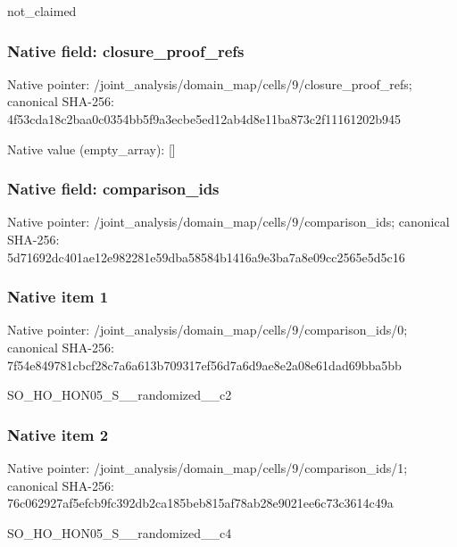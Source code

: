 \documentclass[10pt,a4paper]{article}
\begin{document}
\begingroup\raggedright\sloppy not\_\allowbreak{}claimed\par\endgroup

\subsubsection{Native field: closure\_\allowbreak{}proof\_\allowbreak{}refs}
Native pointer: /joint\_\allowbreak{}analysis/domain\_\allowbreak{}map/cells/9/closure\_\allowbreak{}proof\_\allowbreak{}refs; canonical SHA-256: 4f53cda18c2baa0c0354bb5f9a3ecbe5ed12ab4d8e11ba873c2f11161202b945

Native value (empty\_\allowbreak{}array): []

\subsubsection{Native field: comparison\_\allowbreak{}ids}
Native pointer: /joint\_\allowbreak{}analysis/domain\_\allowbreak{}map/cells/9/comparison\_\allowbreak{}ids; canonical SHA-256: 5d71692dc401ae12e982281e59dba58584b1416a9e3ba7a8e09cc2565e5d5c16

\subsubsection{Native item 1}
Native pointer: /joint\_\allowbreak{}analysis/domain\_\allowbreak{}map/cells/9/comparison\_\allowbreak{}ids/0; canonical SHA-256: 7f54e849781cbcf28c7a6a613b709317ef56d7a6d9ae8e2a08e61dad69bba5bb

\begingroup\raggedright\sloppy SO\_\allowbreak{}HO\_\allowbreak{}HON05\_\allowbreak{}S\_\allowbreak{}\_\allowbreak{}randomized\_\allowbreak{}\_\allowbreak{}c2\par\endgroup

\subsubsection{Native item 2}
Native pointer: /joint\_\allowbreak{}analysis/domain\_\allowbreak{}map/cells/9/comparison\_\allowbreak{}ids/1; canonical SHA-256: 76c062927af5efcb9fc392db2ca185beb815af78ab28e9021ee6c73c3614c49a

\begingroup\raggedright\sloppy SO\_\allowbreak{}HO\_\allowbreak{}HON05\_\allowbreak{}S\_\allowbreak{}\_\allowbreak{}randomized\_\allowbreak{}\_\allowbreak{}c4\par\endgroup
\end{document}
